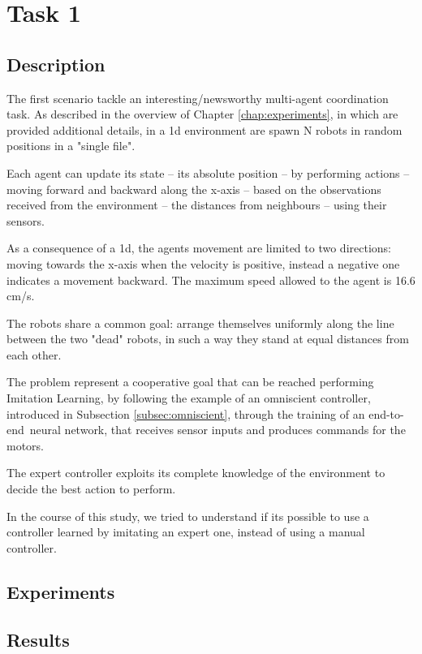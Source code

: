 \section{Task 1}
\label{sec:task1}

\subsection{Description}
\label{subsec:desc1}

The first scenario tackle an interesting/newsworthy multi-agent coordination task.
As described in the overview of Chapter \ref{chap:experiments}, in which are 
provided additional details, in a \gls{1d} environment are spawn N robots in 
random positions in a "single file". %

Each agent can update its state – its absolute position – by performing actions – 
moving forward and backward along the x-axis – based on the observations 
received from the environment – the distances from neighbours – using their 
sensors.

As a consequence of a \gls{1d}, the agents movement are limited to two 
directions: moving towards the x-axis when the velocity is positive, instead a 
negative one indicates a movement backward. 
The maximum speed allowed to the agent is 16.6 \gls{cm/s}.

The robots share a common goal: arrange themselves uniformly along the line 
between the two "dead" robots, in such a way they stand at equal distances from 
each other.


The problem represent a cooperative goal that can be reached performing 
Imitation Learning, by following the example of an omniscient controller, 
introduced in Subsection \ref{subsec:omniscient}, through the training of an 
end-to-end neural network, that receives sensor inputs and produces 
commands for the motors.

The expert controller exploits its complete knowledge of the environment %
to decide the best action to perform.

In the course of this study, we tried to understand if its possible to use a controller 
learned by imitating an expert one, instead of using a manual controller.

\subsection{Experiments}
\label{subsec:ex1}

\subsection{Results}
\label{subsec:results1}

